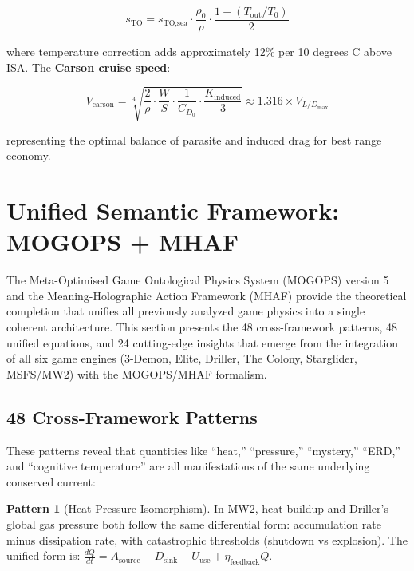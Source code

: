 \documentclass[11pt,a4paper]{article}
\theoremstyle{definition}
\newtheorem{pattern}{Pattern}[section]
\begin{document}
\begin{equation}\label{eq:msfs-to}
s_{\text{TO}} = s_{\text{TO,sea}}\cdot\frac{\rho_0}{\rho}\cdot\frac{1 + (T_{\text{out}}/T_0)}{2}
\end{equation}

where temperature correction adds approximately 12\% per 10 degrees C above ISA. The \textbf{Carson cruise speed}:

\begin{equation}\label{eq:msfs-carson}
V_{\text{carson}} = \sqrt[4]{\frac{2}{\rho}\cdot\frac{W}{S}\cdot\frac{1}{C_{D_0}}\cdot\frac{K_{\text{induced}}}{3}} \approx 1.316 \times V_{L/D_{\max}}
\end{equation}

representing the optimal balance of parasite and induced drag for best range economy.

\section{Unified Semantic Framework: MOGOPS + MHAF}\label{sec:mogops}

The Meta-Optimised Game Ontological Physics System (MOGOPS) version 5 and the Meaning-Holographic Action Framework (MHAF) provide the theoretical completion that unifies all previously analyzed game physics into a single coherent architecture. This section presents the 48 cross-framework patterns, 48 unified equations, and 24 cutting-edge insights that emerge from the integration of all six game engines (3-Demon, Elite, Driller, The Colony, Starglider, MSFS/MW2) with the MOGOPS/MHAF formalism.

\subsection{48 Cross-Framework Patterns}

These patterns reveal that quantities like ``heat,'' ``pressure,'' ``mystery,'' ``ERD,'' and ``cognitive temperature'' are all manifestations of the same underlying conserved current:

\begin{pattern}[Heat-Pressure Isomorphism]
In MW2, heat buildup and Driller's global gas pressure both follow the same differential form: accumulation rate minus dissipation rate, with catastrophic thresholds (shutdown vs explosion). The unified form is: $\frac{dQ}{dt} = A_{\text{source}} - D_{\text{sink}} - U_{\text{use}} + \eta_{\text{feedback}}Q$.
\end{pattern}
\end{document}
